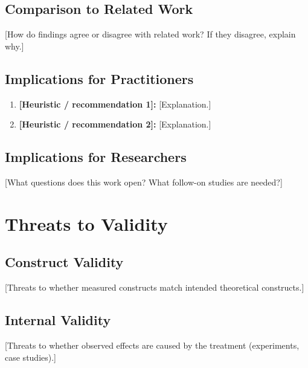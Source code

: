 \documentclass[11pt,a4paper]{article}
\begin{document}
\subsection{Comparison to Related Work}

[How do findings agree or disagree with related work? If they disagree, explain why.]

\subsection{Implications for Practitioners}

\begin{enumerate}
  \item \textbf{[Heuristic / recommendation 1]:} [Explanation.]
  \item \textbf{[Heuristic / recommendation 2]:} [Explanation.]
\end{enumerate}

\subsection{Implications for Researchers}

[What questions does this work open? What follow-on studies are needed?]


\section{Threats to Validity}
\label{sec:threats}

\subsection{Construct Validity}

[Threats to whether measured constructs match intended theoretical constructs.]

\subsection{Internal Validity}

[Threats to whether observed effects are caused by the treatment (experiments, case studies).]
\end{document}
